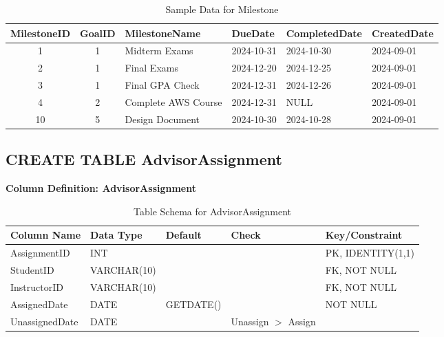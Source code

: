 \documentclass[12pt,a4paper]{report}
\begin{document}
\begin{table}[ht]
\centering
\small
\begin{tabular}{|c|c|p{5cm}|l|l|l|}
\hline
\textbf{MilestoneID} & \textbf{GoalID} & \textbf{MilestoneName} & \textbf{DueDate} & \textbf{CompletedDate} & \textbf{CreatedDate} \\ \hline
1 & 1 & Midterm Exams & 2024-10-31 & 2024-10-30 & 2024-09-01 \\ \hline
2 & 1 & Final Exams & 2024-12-20 & 2024-12-25 & 2024-09-01 \\ \hline
3 & 1 & Final GPA Check & 2024-12-31 & 2024-12-26 & 2024-09-01 \\ \hline
4 & 2 & Complete AWS Course & 2024-12-31 & NULL & 2024-09-01 \\ \hline
10 & 5 & Design Document & 2024-10-30 & 2024-10-28 & 2024-09-01 \\ \hline
\end{tabular}
\caption{Sample Data for Milestone}
\label{tab:milestone_data}
\end{table}

\vspace{5cm}

\subsection{CREATE TABLE AdvisorAssignment}

\textbf{Column Definition: AdvisorAssignment}

\begin{table}[ht]
\centering
\small
\begin{tabular}{|l|l|l|l|l|}
\hline
\textbf{Column Name} & \textbf{Data Type} & \textbf{Default} & \textbf{Check} & \textbf{Key/Constraint} \\ \hline
AssignmentID & INT & & & PK, IDENTITY(1,1) \\ \hline
StudentID & VARCHAR(10) & & & FK, NOT NULL \\ \hline
InstructorID & VARCHAR(10) & & & FK, NOT NULL \\ \hline
AssignedDate & DATE & GETDATE() & & NOT NULL \\ \hline
UnassignedDate & DATE & & Unassign $>$ Assign & \\ \hline
\end{tabular}
\caption{Table Schema for AdvisorAssignment}
\label{tab:advisor_assignment_schema}
\end{table}
\end{document}
